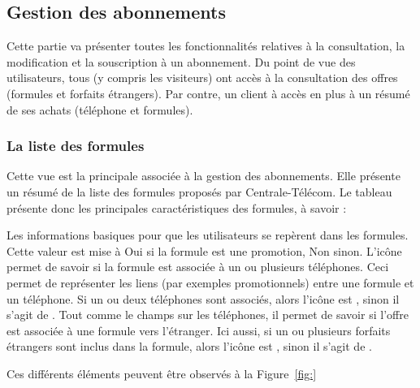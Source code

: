 \subsection{Gestion des abonnements}
Cette partie va présenter toutes les fonctionnalités relatives à la consultation, la modification et la souscription à un abonnement. Du point de vue des utilisateurs, tous (y compris les visiteurs) ont accès à la consultation des offres (formules et forfaits étrangers). Par contre, un client à accès en plus à un résumé de ses achats (téléphone et formules).

\subsubsection{La liste des formules}
Cette vue est la principale associée à la gestion des abonnements. Elle présente un résumé de la liste des formules proposés par Centrale-Télécom. Le tableau présente donc les principales caractéristiques des formules, à savoir :
\begin{itemize}
  Les informations basiques pour que les utilisateurs se repèrent dans les formules.
  Cette valeur est mise à \og Oui\fg{} si la formule est une promotion, \og Non\fg{} sinon.
  L'icône permet de savoir si la formule est associée à un ou plusieurs téléphones. Ceci permet de représenter les liens (par exemples promotionnels) entre une formule et un téléphone. Si un ou deux téléphones sont associés, alors l'icône est \vColor{\faMobilePhone}, sinon il s'agit de \thColor{\faMobilePhone}.
  Tout comme le champs sur les téléphones, il permet de savoir si l'offre est associée à une formule vers l'étranger. Ici aussi, si un ou plusieurs forfaits étrangers sont inclus dans la formule, alors l'icône est \vColor{\faGlobe}, sinon il s'agit de \thColor{\faGlobe}.
\end{itemize}
Ces différents éléments peuvent être observés à la Figure~\ref{fig:}


